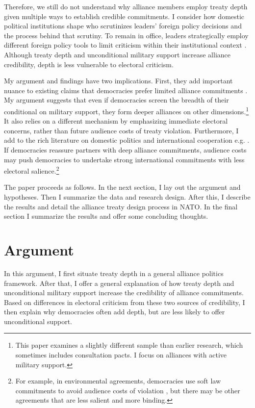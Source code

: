 \documentclass[12pt]{article}
\begin{document}
Therefore, we still do not understand why alliance members employ treaty depth given multiple ways to establish credible commitments. 
I consider how domestic political institutions shape who scrutinizes leaders' foreign policy decisions and the process behind that scrutiny.
To remain in office, leaders strategically employ different foreign policy tools to limit criticism within their institutional context \cite{HydeSaunders2020}. 
Although treaty depth and unconditional military support increase alliance credibility, depth is less vulnerable to electoral criticism. 


My argument and findings have two implications. 
First, they add important nuance to existing claims that democracies prefer limited alliance commitments \citep{Mattes2012, Chibaetal2015, FjelstulReiter2019}. 
My argument suggests that even if democracies screen the breadth of their conditional on military support, they form deeper alliances on other dimensions.\footnote{This paper examines a slightly different sample than earlier research, which sometimes includes consultation pacts. I focus on alliances with active military support.}  
It also relies on a different mechanism by emphasizing immediate electoral concerns, rather than future audience costs of treaty violation.
Furthermore, I add to the rich literature on domestic politics and international cooperation e.g. \citep{DownesRocke1995, Fearon1998, Leeds1999, MattesRodriguez2014}. 
If democracies reassure partners with deep alliance commitments, audience costs may push democracies to undertake strong international commitments with less electoral salience.\footnote{For example, in environmental agreements, democracies use soft law commitments to avoid audience costs of violation \citep{BoehmeltButkute2018}, but there may be other agreements that are less salient and more binding.} 


The paper proceeds as follows. 
In the next section, I lay out the argument and hypotheses. 
Then I summarize the data and research design. 
After this, I describe the results and detail the alliance treaty design process in NATO.
In the final section I summarize the results and offer some concluding thoughts. 


\section{Argument}


In this argument, I first situate treaty depth in a general alliance politics framework.  
After that, I offer a general explanation of how treaty depth and unconditional military support increase the credibility of alliance commitments. 
Based on differences in electoral criticism from these two sources of credibility, I then explain why democracies often add depth, but are less likely to offer unconditional support. 
\end{document}
